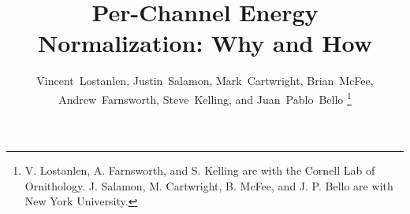 \documentclass[journal]{IEEEtran}
\theoremstyle{remark}
\begin{document}
%
\title{Per-Channel Energy Normalization: Why and How}
%
%
%


\author{Vincent~Lostanlen, Justin~Salamon, Mark~Cartwright, Brian~McFee,\\
Andrew~Farnsworth, Steve~Kelling, and Juan~Pablo~Bello%
\thanks{V. Lostanlen, A. Farnsworth, and S. Kelling are with the Cornell Lab of Ornithology.
J. Salamon, M. Cartwright, B. McFee, and J. P. Bello are with New York University.}%
}

% 
%
\end{document}
